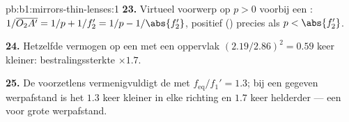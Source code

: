 \begin{solution}{pb:b1:mirrors-thin-lenses:1}
\textbf{23.} Virtueel voorwerp op $p > 0$ voorbij een :
$1/\overline{O_2A'} = 1/p + 1/f_2' = 1/p - 1/\abs{f_2'}$, positief () precies als $p < \abs{f_2'}$.

\textbf{24.} Hetzelfde vermogen op een  met een oppervlak $(2.19/2.86)^2 = 0.59$
keer kleiner: bestralingssterkte $\times 1.7$.

\textbf{25.} De voorzetlens vermenigvuldigt de  met
$f_{\mathrm{eq}}/f_1' = 1.3$; bij een gegeven werpafstand is het  $1.3$
keer kleiner in elke richting en $1.7$ keer helderder --- een  voor
grote werpafstand.
\end{solution}
